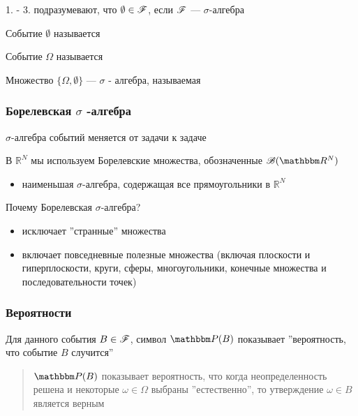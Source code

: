 \begin{frame}

    \vspace{2em}
    1. - 3. подразумевают, что $\emptyset \in \mathscr F$, если $\mathscr F$ --- $\sigma$-алгебра
    
     Событие $\emptyset$ называется  
    
     Событие $\Omega$ называется 
    
    \vspace{1em}
    \Eg Множество $\{\Omega, \emptyset\}$ --- $\sigma$ - алгебра, называемая 
    
\end{frame}

\begin{frame}\frametitle{Борелевская $\sigma$ -алгебра}
    
    \vspace{2em}
    $\sigma$-алгебра событий меняется от задачи к задаче
    
    В $\mathbb{R}^{N}$ мы используем Борелевские множества, обозначенные $\bB(\RR^N)$ 
    \begin{itemize}
        \item наименьшая $\sigma$-алгебра, содержащая все прямоугольники в $\mathbb{R}^{N}$ 
    \end{itemize}
    
    Почему Борелевская $\sigma$-алгебра?
    \begin{itemize}
        \item исключает ''странные'' множества 
        \item включает повседневные полезные множества (включая плоскости и гиперплоскости, 
        круги, сферы, многоугольники, конечные множества и последовательности точек)
    \end{itemize}
    
\end{frame}

\begin{frame}\frametitle{Вероятности}

    \vspace{2em}
    Для данного события $B\in \mathscr F$, символ
    $\PP(B)$ показывает ''вероятность, что событие $B$
    случится''
    \begin{quote}
        $\PP(B)$ показывает вероятность, что
        когда неопределенность решена и некоторые $\omega \in \Omega$ выбраны
        ''естественно'', то утверждение $\omega \in B$ является верным
    \end{quote}
    
\end{frame}

